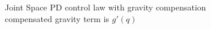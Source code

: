 \documentclass{article}
\begin{document}
\begin{figure}[H]
    \captionsetup{justification=centering}
    \noindent

    \caption{Joint Space PD control law with gravity compensation \\ compensated gravity term is $g'(q)$}
    \label{fig:js_PD_gravity_compensation_joint_wrong_g}
\end{figure}
\end{document}
